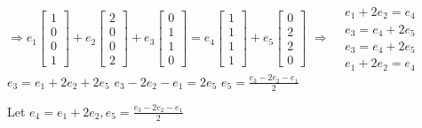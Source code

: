 \documentclass[11pt]{article}
\begin{document}
\begin{enumerate}[{\bf Q1.}]
\begin{enumerate}
			$\Rightarrow e_1\left[\begin{array}{l}1 \\ 0 \\ 0 \\ 1\end{array}\right]+e_2\left[\begin{array}{l}2 \\ 0 \\ 0 \\ 2\end{array}\right]+e_3\left[\begin{array}{l}0 \\ 1 \\ 1 \\ 0\end{array}\right]=e_4\left[\begin{array}{l}1 \\ 1 \\ 1 \\ 1\end{array}\right]+e_5\left[\begin{array}{l}0 \\ 2 \\ 2 \\ 0\end{array}\right]$ \newline
			$\Rightarrow \begin{array}{ll} & e_1+2 e_2=e_4 \\ & e_3=e_4+2 e_5 \\ & e_3=e_4+2 e_5 \\ & e_1+2 e_2=e_4\end{array}$ \newline
			\newline
			$e_3=e_1+2 e_2+2 e_5$ \newline
			$e_3-2 e_2-e_1=2 e_5$ \newline
			$e_5=\frac{e_3-2 e_2-e_1}{2}$ \newline
			
			Let $e_4=e_1+2 e_2, e_5=\frac{e_3-2 e_2-e_1}{2}$ \newline


\end{enumerate}
\end{enumerate}
\end{document}
